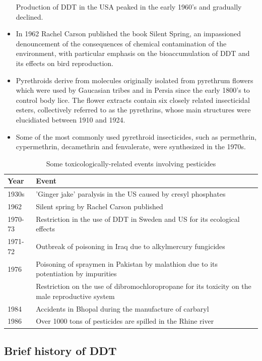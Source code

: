 \documentclass[
  openany]{book}
\begin{document}
\begin{itemize}
  Production of DDT in the USA peaked in the early 1960's and gradually declined.
\item
  In 1962 Rachel Carson published the book Silent Spring, an impassioned denouncement of the consequences of chemical contamination of the environment, with particular emphasis on the bioaccumulation of DDT and its effects on bird reproduction.
\item
  Pyrethroids derive from molecules originally isolated from pyrethrum flowers which were used by Gaucasian tribes and in Persia since the early 1800's to control body lice. The flower extracts contain six closely related insecticidal esters, collectively referred to as the pyrethrins, whose main structures were elucidiated between 1910 and 1924.
\item
  Some of the most commonly used pyrethroid insecticides, such as permethrin, cypermethrin, decamethrin and fenvalerate, were synthesized in the 1970s.
\end{itemize}

\begin{table}

\caption{\label{tab:unnamed-chunk-8}Some toxicologically-related events involving pesticides}
\centering
\begin{tabular}[t]{ll}
\toprule
Year & Event\\
\midrule
1930s & 'Ginger jake' paralysis in the US caused by cresyl phosphates\\
1962 & Silent spring by Rachel Carson published\\
1970-73 & Restriction in the use of DDT in Sweden and US for its ecological effects\\
1971-72 & Outbreak of poisoning in Iraq due to alkylmercury fungicides\\
1976 & Poisoning of spraymen in Pakistan by malathion due to its potentiation by impurities\\
\addlinespace
1977 & Restriction on the use of dibromochloropropane for its toxicity on the male reproductive system\\
1984 & Accidents in Bhopal during the manufacture of carbaryl\\
1986 & Over 1000 tons of pesticides are spilled in the Rhine river\\
\bottomrule
\end{tabular}
\end{table}

\hypertarget{brief-history-of-ddt}{%
\subsection{Brief history of DDT}\label{brief-history-of-ddt}}
\end{document}
